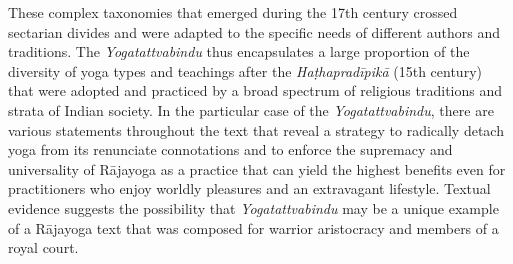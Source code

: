 These complex taxonomies that emerged during the 17th century crossed sectarian divides and were adapted to the specific needs of different authors and traditions. The \textit{Yogatattvabindu} thus encapsulates a large proportion of the diversity of yoga types and teachings after the \textit{Haṭhapradīpikā} (15th century) that were adopted and practiced by a broad spectrum of religious traditions and strata of Indian society. In the particular case of the \textit{Yogatattvabindu}, there are various statements throughout the text that reveal a strategy to radically detach yoga from its renunciate connotations and to enforce the supremacy and universality of Rājayoga as a practice that can yield the highest benefits even for practitioners who enjoy worldly pleasures and an extravagant lifestyle. Textual evidence suggests the possibility that \textit{Yogatattvabindu} may be a unique example of a Rājayoga text that was composed for warrior aristocracy and members of a royal court. 

